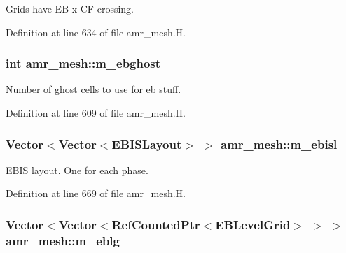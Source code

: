 Grids have EB x CF crossing. 



Definition at line 634 of file amr\+\_\+mesh.\+H.

\subsubsection[{\texorpdfstring{m\+\_\+ebghost}{m_ebghost}}]{\setlength{\rightskip}{0pt plus 5cm}int amr\+\_\+mesh\+::m\+\_\+ebghost\hspace{0.3cm}{\ttfamily [protected]}}\hypertarget{classamr__mesh_a14a7a1d4168963725748659b52bc1d5c}{}\label{classamr__mesh_a14a7a1d4168963725748659b52bc1d5c}


Number of ghost cells to use for eb stuff. 



Definition at line 609 of file amr\+\_\+mesh.\+H.

\subsubsection[{\texorpdfstring{m\+\_\+ebisl}{m_ebisl}}]{\setlength{\rightskip}{0pt plus 5cm}Vector$<$Vector$<$E\+B\+I\+S\+Layout$>$ $>$ amr\+\_\+mesh\+::m\+\_\+ebisl\hspace{0.3cm}{\ttfamily [protected]}}\hypertarget{classamr__mesh_ad46c16526616b96bac5ac7345618424a}{}\label{classamr__mesh_ad46c16526616b96bac5ac7345618424a}


E\+B\+IS layout. One for each phase. 



Definition at line 669 of file amr\+\_\+mesh.\+H.

\subsubsection[{\texorpdfstring{m\+\_\+eblg}{m_eblg}}]{\setlength{\rightskip}{0pt plus 5cm}Vector$<$Vector$<$Ref\+Counted\+Ptr$<$E\+B\+Level\+Grid$>$ $>$ $>$ amr\+\_\+mesh\+::m\+\_\+eblg\hspace{0.3cm}{\ttfamily [protected]}}\hypertarget{classamr__mesh_a852e94a4c9a5c9970a9bf5777e5cc3de}{}\label{classamr__mesh_a852e94a4c9a5c9970a9bf5777e5cc3de}


